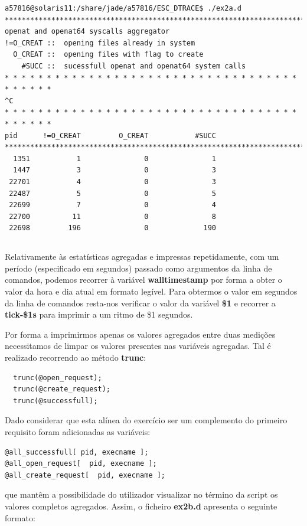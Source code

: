 \documentclass[a4paper]{article}
\begin{document}
\begin{lstlisting}[basicstyle=\scriptsize]
a57816@solaris11:/share/jade/a57816/ESC_DTRACE$ ./ex2a.d 
*********************************************************************************
openat and openat64 syscalls aggregator
!=O_CREAT ::  opening files already in system
  O_CREAT ::  opening files with flag to create
    #SUCC ::  sucessfull openat and openat64 system calls
* * * * * * * * * * * * * * * * * * * * * * * * * * * * * * * * * * * * * * * * *
^C
* * * * * * * * * * * * * * * * * * * * * * * * * * * * * * * * * * * * * * * * *
pid      !=O_CREAT         O_CREAT           #SUCC
*********************************************************************************
  1351           1               0               1
  1447           3               0               3
 22701           4               0               3
 22487           5               0               5
 22699           7               0               4
 22700          11               0               8
 22698         196               0             190
 \end{lstlisting}

\par 
\subsection{}
Relativamente às estatísticas agregadas e impressas repetidamente, com um período (especificado em segundos) passado como argumentos da linha de comandos, podemos recorrer à variável \textbf{walltimestamp} por forma a obter o valor da hora e dia atual em formato legível. Para obtermos o valor em segundos da linha de comandos resta-nos verificar o valor da variável \textbf{\$1} e recorrer a \textbf{tick-\$1s} para imprimir a um ritmo de \$1 segundos.\par 
Por forma a imprimirmos apenas os valores agregados entre duas medições necessitamos de limpar os valores presentes nas variáveis agregadas. Tal é realizado recorrendo ao método \textbf{trunc}:
\begin{lstlisting}
  trunc(@open_request);
  trunc(@create_request);
  trunc(@successfull);
 \end{lstlisting}
Dado considerar que esta alínea do exercício ser um complemento do primeiro requisito foram adicionadas as variáveis:

\begin{lstlisting}
@all_successfull[ pid, execname ];
@all_open_request[  pid, execname ];
@all_create_request[  pid, execname ];
 \end{lstlisting}
 que mantêm a possibilidade do utilizador visualizar no término da script os valores completos agregados.
Assim, o ficheiro \textbf{ex2b.d} apresenta o seguinte formato:
\end{document}
